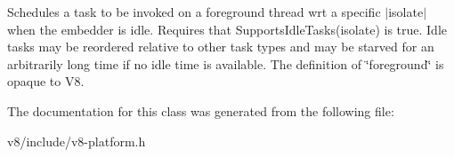 Schedules a task to be invoked on a foreground thread wrt a specific $\vert$isolate$\vert$ when the embedder is idle. Requires that Supports\+Idle\+Tasks(isolate) is true. Idle tasks may be reordered relative to other task types and may be starved for an arbitrarily long time if no idle time is available. The definition of \char`\"{}foreground\char`\"{} is opaque to V8. 

The documentation for this class was generated from the following file\+:\begin{DoxyCompactItemize}
\item 
v8/include/v8-\/platform.\+h\end{DoxyCompactItemize}
